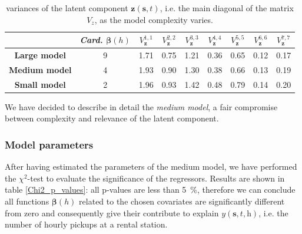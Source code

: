  \begin{table}[h!]
 	\centering
 	\renewcommand\arraystretch{1.3}
 	\begin{tabular}{c|c|c|c|c|c|c|c|c}
 		\hline
 		\textit{} & \textit{Card.} $\boldsymbol{\beta}(h)$ & $V_{\boldsymbol{z}}^{1,1}$ & $V_{\boldsymbol{z}}^{2,2}$ & $V_{\boldsymbol{z}}^{3,3}$ & $V_{\boldsymbol{z}}^{4,4}$ & $V_{\boldsymbol{z}}^{5,5}$ & $V_{\boldsymbol{z}}^{6,6}$ & $V_{\boldsymbol{z}}^{7,7}$ \\
 		\hline
 		\textbf{Large model} & \num{9} & \num{1.71} & \num{0.75} & \num{1.21} & \num{0.36} & \num{0.65} & \num{0.12} & \num{0.17} \\
 		\hline
 		\textbf{Medium model} & \num{4} & \num{1.93} & \num{0.90} & \num{1.30} & \num{0.38} & \num{0.66} & \num{0.13} & \num{0.19} \\
 		\hline
 		\textbf{Small model} & \num{2} & \num{1.96} & \num{0.93} & \num{1.42} & \num{0.48} & \num{0.79} & \num{0.14} & \num{0.20} \\
 		\hline
 	\end{tabular}
 	\caption[Variances of the latent component $\boldsymbol{z}(\boldsymbol{s}, t)$ as the model complexity varies (f-HDGM)]{variances of the latent component $\boldsymbol{z}(\boldsymbol{s}, t)$, i.e. the main diagonal of the matrix $V_z$, as the model complexity varies.}
 	\label{V_z_values}
 \end{table}
\noindent
We have decided to describe in detail the \textit{medium model}, a fair compromise between complexity and relevance of the latent component.

\subsubsection{Model parameters}
After having estimated the parameters of the medium model, we have performed the $\chi^2$-test to evaluate the significance of the regressors. Results are shown in table \ref{Chi2_p_values}: all p-values are less than \SI{5}{\percent}, therefore we can conclude all functions $\boldsymbol{\beta}(h)$ related to the chosen covariates are significantly different from zero and consequently give their contribute to explain $\mathit{y}(\boldsymbol{s}, \textit{t}, \textit{h})$, i.e. the number of hourly pickups at a rental station.

